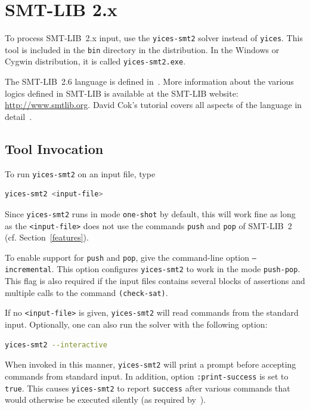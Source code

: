 \documentclass[11pt,twoside,fleqn,openright,titlepage]{cslreport}
\begin{document}
\section{SMT-LIB 2.x}

To process SMT-LIB~2.x input, use the \texttt{yices-smt2} solver
instead of \texttt{yices}. This tool is included in the \texttt{bin}
directory in the distribution. In the Windows or Cygwin distribution,
it is called \texttt{yices-smt2.exe}.

\medskip\noindent The SMT-LIB~2.6 language is defined
in~\cite{SMTLIB26:2017}. More information about the various logics
defined in SMT-LIB is available at the SMT-LIB website:
\url{http://www.smtlib.org}. David Cok's tutorial covers all aspects
of the language in detail~\cite{SMTLIB:tutorial:2013}.


\subsection{Tool Invocation}

To run \texttt{yices-smt2} on an input file, type
\begin{small}
\begin{lstlisting}[language=sh]
   yices-smt2 <input-file>
\end{lstlisting}
\end{small}
Since \texttt{yices-smt2} runs in mode \texttt{one-shot} by default,
this will work fine as long as the \texttt{<input-file>} does not use
the commands \texttt{push} and \texttt{pop} of SMT-LIB~2
(cf. Section~\ref{features}).

\medskip\noindent To enable support for \texttt{push} and
\texttt{pop}, give the command-line option \texttt{--incremental}.
This option configures \texttt{yices-smt2} to work in the mode
\texttt{push-pop}. This flag is also required if the input files
contains several blocks of assertions and multiple calls to the
command \texttt{(check-sat)}.

\medskip\noindent If no \texttt{<input-file>} is given,
\texttt{yices-smt2} will read commands from the standard
input. Optionally, one can also run the solver with
the following option:
\begin{small}
\begin{lstlisting}[language=sh]
   yices-smt2 --interactive
\end{lstlisting}
\end{small}
When invoked in this manner, \texttt{yices-smt2} will print a prompt
before accepting commands from standard input. In addition, option
\texttt{:print-success} is set to \texttt{true}. This causes
\texttt{yices-smt2} to report \texttt{success} after various commands
that would otherwise be executed silently (as required
by~\cite{SMTLIB25:2015}).
\end{document}
